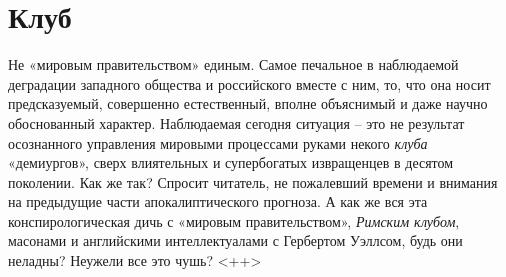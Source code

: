  
 
 
 
 
\chapter{Клуб}


Не «мировым правительством» единым.  Самое печальное в наблюдаемой деградации
западного общества и российского вместе с ним, то, что она носит предсказуемый,
совершенно естественный, вполне объяснимый и даже научно обоснованный характер.
Наблюдаемая сегодня ситуация – это не результат осознанного управления мировыми
процессами руками некого \emph{клуба} «демиургов», сверх влиятельных и
супербогатых извращенцев в десятом поколении.  Как же так? Спросит читатель, не
пожалевший времени и внимания на предыдущие части апокалиптического прогноза. А
как же вся эта конспирологическая дичь с «мировым правительством»,
\emph{Римским клубом}, масонами и английскими интеллектуалами с Гербертом
Уэллсом, будь они неладны? Неужели все это чушь?
  <++>
